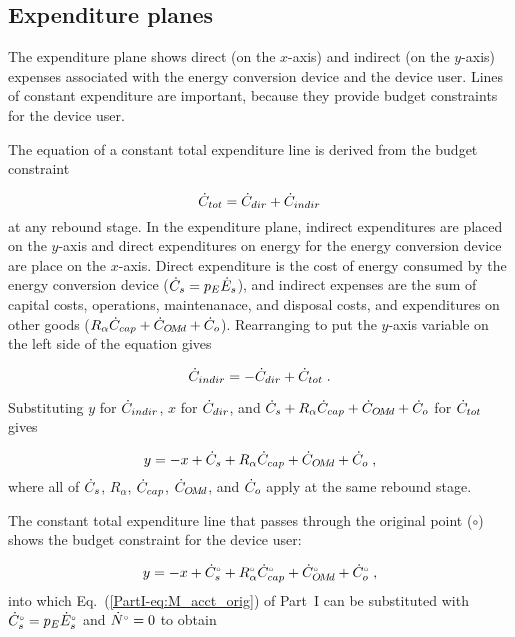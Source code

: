 \subsection{Expenditure planes}
\label{sec:expenditure_path_graph_details}

The expenditure plane shows direct (on the $x$-axis) and indirect (on the $y$-axis)
expenses associated with the energy conversion device 
and the device user.
Lines of constant expenditure are important, 
because they provide budget constraints for the device user.

The equation of a constant total expenditure line is derived from 
the budget constraint

\begin{equation}
  \dot{C}_{tot} = \dot{C}_{dir} + \dot{C}_{indir}
\end{equation}
%
at any rebound stage.
In the expenditure plane,
indirect expenditures are placed on the $y$-axis
and direct expenditures on energy for the energy conversion device are place on the $x$-axis.
Direct expenditure is the cost of energy consumed by the energy conversion device
($\dot{C}_s = p_E \dot{E}_s$), and 
indirect expenses are the sum of capital costs,
operations, maintenanace, and disposal costs, and 
expenditures on other goods
($R_\alpha \dot{C}_{cap} + \dot{C}_{O\!M\!d} + \dot{C}_o$).
Rearranging to put the $y$-axis variable on the left side of the equation gives

\begin{equation}
  \dot{C}_{indir} = - \dot{C}_{dir} + \dot{C}_{tot} \; .
\end{equation}

Substituting $y$ for $\dot{C}_{indir}$, 
$x$ for $\dot{C}_{dir}$, and 
$\dot{C}_s + R_\alpha \dot{C}_{cap} + \dot{C}_{O\!M\!d} + \dot{C}_o$ for $\dot{C}_{tot}$
gives

\begin{equation}
  y = -x + \dot{C}_s + R_\alpha \dot{C}_{cap} + \dot{C}_{O\!M\!d} + \dot{C}_o \; ,
\end{equation}
%
where all of $\dot{C}_s$, $R_\alpha$, $\dot{C}_{cap}$, $\dot{C}_{O\!M\!d}$, and $\dot{C}_o$
apply at the same rebound stage.

The constant total expenditure line 
that passes through the original point ($\circ$)
shows the budget constraint for the device user:

\begin{equation}
  y = -x + {}{\dot{C}}^{\scriptscriptstyle \circ}_s + {}{R}^{\scriptscriptstyle \circ}_\alpha {}{\dot{C}}^{\scriptscriptstyle \circ}_{cap} + {}{\dot{C}}^{\scriptscriptstyle \circ}_{O\!M\!d} + {}{\dot{C}}^{\scriptscriptstyle \circ}_o \; ,
\end{equation}
%
into which Eq.~(\ref{PartI-eq:M_acct_orig}) of Part~I can be substituted with 
${}{\dot{C}}^{\scriptscriptstyle \circ}_s = p_E {}{\dot{E}}^{\scriptscriptstyle \circ}_s$ and 
${}{\dot{N}}^{\scriptscriptstyle \circ} = 0$ to obtain

